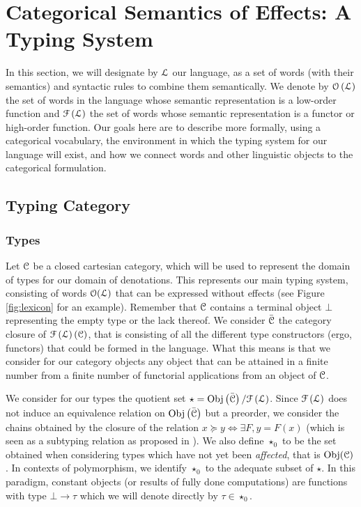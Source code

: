 \section{Categorical Semantics of Effects: A Typing System}
\label{sec:typingsystem}
In this section, we will designate by $\mathcal{L}$ our language, as a set of words
(with their semantics) and syntactic rules to combine them semantically.
We denote by $\mathcal{O}\left( \mathcal{L} \right)$ the set of words in the language whose
semantic representation is a low-order function and $\mathcal{F}\left( \mathcal{L} \right)$ the
set of words whose semantic representation is a functor or high-order function.
Our goals here are to describe more formally, using a categorical vocabulary,
the environment in which the typing system for our language will exist, and how
we connect words and other linguistic objects to the categorical formulation.

\subsection{Typing Category}\label{subsec:typingcategory}
\subsubsection{Types}\label{subsubsec:types}
Let $\mathcal{C}$ be a closed cartesian category, which will be used to represent the
domain of types for our domain of denotations.
This represents our main typing system, consisting of words $\mathcal{O}(\mathcal{L})$ that can
be expressed without effects (see Figure \ref{fig:lexicon} for an example).
Remember that $\mathcal{C}$ contains a terminal object $\bot$ representing the empty
type or the lack thereof.
We consider $\bar{\mathcal{C}}$ the category closure of
$\mathcal{F}\left( \mathcal{L} \right)\left(\mathcal{C}\right)$, that is consisting of
all the different type constructors (ergo, functors) that could be formed in
the language.
What this means is that we consider for our category objects any object that
can be attained in a finite number from a finite number of functorial
applications from an object of $\mathcal{C}$.

We consider for our types the quotient set
$\star = \mathrm{Obj}\left( \bar{\mathcal{C}} \right)/\mathcal{F}\left( \mathcal{L} \right)$.
Since $\mathcal{F}\left( \mathcal{L} \right)$ does not induce an equivalence relation on
$\operatorname{Obj}\left( \bar{\mathcal{C}} \right)$ but a preorder, we consider the chains obtained
by the closure of the relation $x\succeq y \Leftrightarrow \exists F, y = F(x)$
(which is seen as a subtyping relation as proposed in
\cite{melliesFunctorsAreType2015}).
We also define $\star_{0}$ to be the set obtained when considering types which
have not yet been \emph{affected}, that is $\operatorname{Obj}(\mathcal{C})$.
In contexts of polymorphism, we identify $\star_{0}$ to the adequate subset of
$\star$.
In this paradigm, constant objects (or results of fully done computations) are
functions with type $\bot \to \tau$ which we will denote directly by
$\tau \in \star_{0}$.

